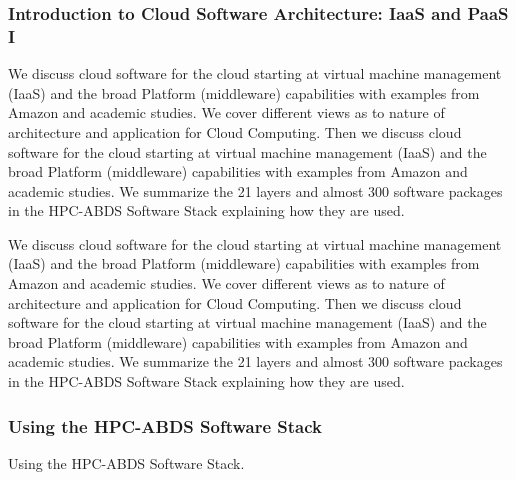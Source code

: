 
\subsubsection{Introduction to Cloud Software Architecture: IaaS and  PaaS I}

We discuss cloud software for the cloud starting at virtual machine
management (IaaS) and the broad Platform (middleware) capabilities with
examples from Amazon and academic studies. We cover different views as
to nature of architecture and application for Cloud Computing. Then we
discuss cloud software for the cloud starting at virtual machine
management (IaaS) and the broad Platform (middleware) capabilities with
examples from Amazon and academic studies. We summarize the 21 layers
and almost 300 software packages in the HPC-ABDS Software Stack
explaining how they are used.




We discuss cloud software for the cloud starting at virtual machine
management (IaaS) and the broad Platform (middleware) capabilities with
examples from Amazon and academic studies. We cover different views as
to nature of architecture and application for Cloud Computing. Then we
discuss cloud software for the cloud starting at virtual machine
management (IaaS) and the broad Platform (middleware) capabilities with
examples from Amazon and academic studies. We summarize the 21 layers
and almost 300 software packages in the HPC-ABDS Software Stack
explaining how they are used.






\subsubsection{Using the HPC-ABDS Software Stack}

Using the HPC-ABDS Software Stack.


